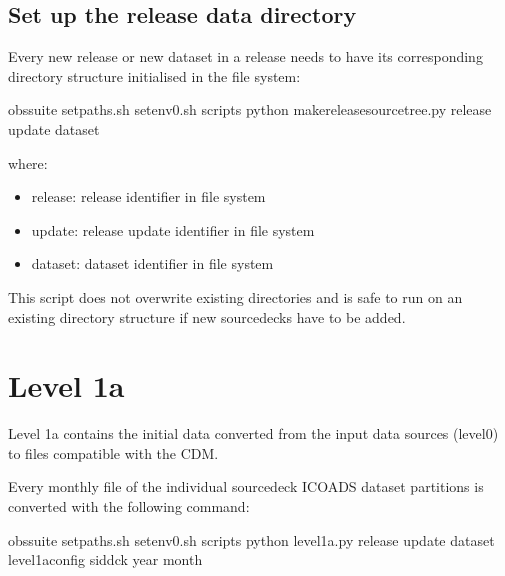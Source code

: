 \documentclass[letterpaper,10pt,english]{sphinxmanual}
\begin{document}
\section{Set up the release data directory}
\label{\detokenize{index:set-up-the-release-data-directory}}
Every new release or new dataset in a release needs to have its corresponding
directory structure initialised in the file system:

\begin{sphinxVerbatim}[commandchars=\\\{\}]
 obs\PYGZhy{}suite
 setpaths.sh
 setenv0.sh
 scripts
python make\PYGZus{}release\PYGZus{}source\PYGZus{}tree.py   release update dataset
\end{sphinxVerbatim}

where:
\begin{itemize}
\item {}
release: release identifier in file system

\item {}
update: release update identifier in file system

\item {}
dataset: dataset identifier in file system

\end{itemize}

This script does not overwrite existing directories and is safe to run on an
existing directory structure if new source\sphinxhyphen{}decks have to be added.


\chapter{Level 1a}
\label{\detokenize{index:level-1a}}
Level 1a contains the initial data converted from the input data sources
(level0) to files compatible with the CDM.

Every monthly file of the individual source\sphinxhyphen{}deck ICOADS dataset partitions is
converted with the following command:

\begin{sphinxVerbatim}[commandchars=\\\{\}]
 obs\PYGZhy{}suite
 setpaths.sh
 setenv0.sh
 scripts
python level1a.py  release update dataset level1a\PYGZus{}config sid\PYGZhy{}dck year month
\end{sphinxVerbatim}
\end{document}
